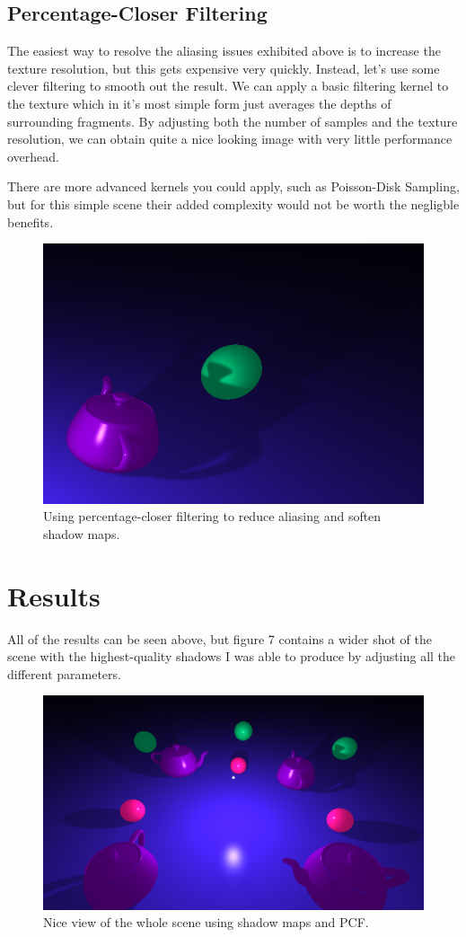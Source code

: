 \documentclass[acmsmall, screen, authorversion, nonacm]{acmart}
\begin{document}
\subsection{Percentage-Closer Filtering}

The easiest way to resolve the aliasing issues exhibited above is to increase the texture resolution, but this gets expensive very quickly. Instead, let's use some clever filtering to smooth out the result. We can apply a basic filtering kernel to the texture which in it's most simple form just averages the depths of surrounding fragments. By adjusting both the number of samples and the texture resolution, we can obtain quite a nice looking image with very little performance overhead.

There are more advanced kernels you could apply, such as Poisson-Disk Sampling, but for this simple scene their added complexity would not be worth the negligble benefits.

\begin{figure}
	\includegraphics[width=.49\linewidth]{images/pcf_1}
	\caption{Using percentage-closer filtering to reduce aliasing and soften shadow maps.}
\end{figure}

\section{Results}

All of the results can be seen above, but figure 7 contains a wider shot of the scene with the highest-quality shadows I was able to produce by adjusting all the different parameters.

\begin{figure}
	\includegraphics[width=\linewidth]{images/pcf_2}
	\caption{Nice view of the whole scene using shadow maps and PCF.}
\end{figure}
\end{document}
